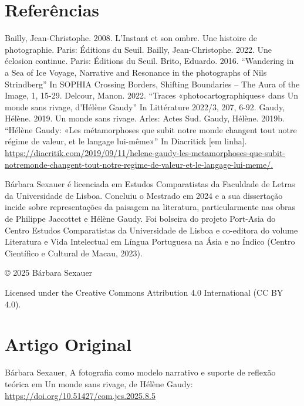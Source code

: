 \documentclass{article}
\begin{document}
\section{Referências}
Bailly, Jean-Christophe. 2008. L’Instant et son ombre. Une histoire de photographie. Paris:
Éditions du Seuil.
Bailly, Jean-Christophe. 2022. Une éclosion continue. Paris: Éditions du Seuil.
Brito, Eduardo. 2016. “Wandering in a Sea of Ice Voyage, Narrative and Resonance in the
photographs of Nils Strindberg” In SOPHIA Crossing Borders, Shifting Boundaries –
The Aura of the Image, 1, 15-29.
Delcour, Manon. 2022. “Traces «photocartographiques» dans Un monde sans rivage, d’Hélène
Gaudy” In Littérature 2022/3, 207, 6-92.
Gaudy, Hélène. 2019. Un monde sans rivage. Arles: Actes Sud.
Gaudy, Hélène. 2019b. “Hélène Gaudy: «Les métamorphoses que subit notre monde changent
tout notre régime de valeur, et le langage lui-même»” In Diacritick [em linha].
\url{https://diacritik.com/2019/09/11/helene-gaudy-les-metamorphoses-que-subit-notremonde-changent-tout-notre-regime-de-valeur-et-le-langage-lui-meme/.}

Bárbara Sexauer é licenciada em Estudos Comparatistas da Faculdade de Letras da Universidade de Lisboa. Concluiu o Mestrado em 2024 e a sua dissertação incide sobre representações da paisagem na literatura, particularmente nas obras de Philippe Jaccottet e Hélène
Gaudy. Foi bolseira do projeto Port-Asia do Centro Estudos Comparatistas da Universidade
de Lisboa e co-editora do volume Literatura e Vida Intelectual em Língua Portuguesa na Ásia
e no Índico (Centro Científico e Cultural de Macau, 2023).

© 2025 Bárbara Sexauer

Licensed under the Creative Commons Attribution 4.0 International (CC BY 4.0).


\section*{Artigo Original}
Bárbara Sexauer, A fotografia como modelo narrativo e suporte de reflexão teórica em Un monde sans rivage, de Hélène Gaudy: \url{https://doi.org/10.51427/com.jcs.2025.8.5}
\end{document}

